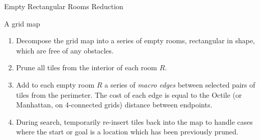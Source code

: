\begin{algorithm}
\caption{Empty Rectangular Rooms Reduction}
\label{alg:rsr}
\begin{algorithmic}
\REQUIRE A grid map 
\begin{enumerate}
\item{\label{alg:rsr:1} Decompose the grid map into a series of empty rooms, rectangular in shape, which are free of any obstacles.}
\item{\label{alg:rsr:2} Prune all tiles from the interior of each room $R$.}
\item{\label{alg:rsr:3} Add to each empty room $R$ a series of \emph{macro edges} between 
selected pairs of tiles from the perimeter. The cost of each edge is equal to
the Octile (or Manhattan, on 4-connected grids) distance between endpoints.}
\item{\label{alg:rsr:4} During search, temporarily re-insert tiles back into the map to handle cases where the
start or goal is a location which has been previously pruned.}
\end{enumerate}
\end{algorithmic}
\end{algorithm}
